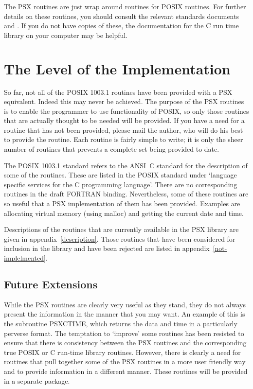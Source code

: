\documentclass[twoside,11pt]{article}
\newcommand{\xlabel}[1]{}
\renewcommand{\_}{\texttt{\symbol{95}}}
\begin{document}
The PSX routines are just wrap around routines for POSIX routines. For further
details on these routines, you should consult the relevant standards documents
\cite{psx:std} and \cite{c:std}. If you do not have copies of these, the
documentation for the C run time library on your computer may be helpful.

\section{\xlabel{the_level_of_the_implementation}The Level of the Implementation}

So far, not all of the POSIX 1003.1 routines have been provided with a
PSX equivalent. Indeed this may never be achieved. The purpose of the
PSX routines is to enable the programmer to use functionality of POSIX,
so only those routines that are actually thought to be needed will be
provided. If you have a need for a routine that has not been provided,
please mail the author, who will do his best to provide the routine.
Each routine is fairly simple to write; it is only the sheer number of
routines that prevents a complete set being provided to date.

The POSIX 1003.1 standard refers to the ANSI~C standard for the
description of some of the routines. These are listed in the POSIX
standard under `language specific services for the C programming
language'. There are no corresponding routines in the draft FORTRAN
binding. Nevertheless, some of these routines are so useful that a PSX
implementation of them has been provided. Examples are allocating
virtual memory (using malloc) and getting the current date and time.

Descriptions of the routines that are currently available in the PSX
library are given in appendix~\ref{description}. Those routines that
have been considered for inclusion in the library and have been
rejected are listed in appendix~\ref{not-implelmented}.

\subsection{\xlabel{future_extensions}Future Extensions}

While the PSX routines are clearly very useful as they stand, they do
not always present the information in the manner that you may want. An
example of this is the subroutine PSX\_CTIME, which returns the data
and time in a particularly perverse format. The temptation to `improve'
some routines has been resisted to ensure that there is consistency
between the PSX routines and the corresponding true POSIX or C run-time
library routines. However, there is clearly a need for routines that
pull together some of the PSX routines in a more user friendly way and
to provide information in a different manner. These routines will be
provided in a separate package.
\end{document}
